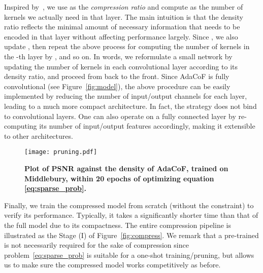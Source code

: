 \documentclass[final]{cvpr}
\begin{document}
\vspace{-0.05in}
\noindent Inspired by~\cite{chen2020neural}, we use  as the \emph{compression ratio} and compute  as the number of kernels we actually need in that layer. The main intuition is that the density ratio  reflects the minimal amount of necessary information that needs to be encoded in that layer without affecting performance largely. Since , we also update , then repeat the above process for computing the number of kernels in the -th layer by , and so on. In words, we reformulate a small network by updating the number of kernels in each convolutional layer according to its density ratio, and proceed from back to the front. Since AdaCoF is fully convolutional (see Figure~\ref{fig:model}), the above procedure can be easily implemented by reducing the number of input/output channels for each layer, leading to a much more compact architecture. In fact, the strategy does not bind to convolutional layers. One can also operate on a fully connected layer by re-computing its number of input/output features accordingly, making it extensible to other architectures.


\begin{figure}[]
\vspace{-.13in}
    \centering
    \texttt{[image: pruning.pdf]}\hfill
    \caption{\textbf{Plot of PSNR against the density of AdaCoF, trained on Middlebury, within 20 epochs of optimizing equation \eqref{eq:sparse_prob}.}}
    \label{fig:prune}
    \vspace{-.2in}
\end{figure}

Finally, we train the compressed model  from scratch (without the  constraint) to verify its performance. Typically, it takes a significantly shorter time than that of the full model  due to its compactness. The entire compression pipeline is illustrated as the Stage (I) of Figure~\ref{fig:compress}. We remark that a pre-trained  is not necessarily required for the sake of compression since problem~\eqref{eq:sparse_prob} is suitable for a one-shot training/pruning, but  allows us to make sure the compressed model works competitively as before.
\end{document}
